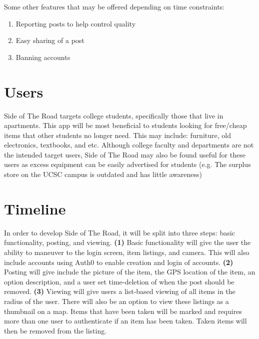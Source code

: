 \documentclass[sigconf]{acmart}
\begin{document}
\noindent
Some other features that may be offered depending on time constraints:
\begin{enumerate}
	\item Reporting posts to help control quality
	\item Easy sharing of a post
	\item Banning accounts
\end{enumerate}


\section{Users}
Side of The Road targets college students, specifically those that live in apartments. This app will be most beneficial to students looking for free/cheap items that other students no longer need. This may include: furniture, old electronics, textbooks, and etc. Although college faculty and departments are not the intended target users, Side of The Road may also be found useful for these users as excess equipment can be easily advertised for students (e.g. The surplus store on the UCSC campus is outdated and has little awareness)

\section{Timeline}
In order to develop Side of The Road, it will be split into three steps: basic functionality, posting, and viewing.
\textbf{(1)} Basic functionality will give the user the ability to maneuver to the login screen, item listings, and camera. This will also include accounts using Auth0 to enable creation and login of accounts.
\textbf{(2)} Posting will give include the picture of the item, the GPS location of the item, an option description, and a user set time-deletion of when the post should be removed. 
\textbf{(3)} Viewing will give users a list-based viewing of all items in the radius of the user. There will also be an option to view these listings as a thumbnail on a map. Items that have been taken will be marked and requires more than one user to authenticate if an item has been taken. Taken items will then be removed from the listing. \\
\end{document}
